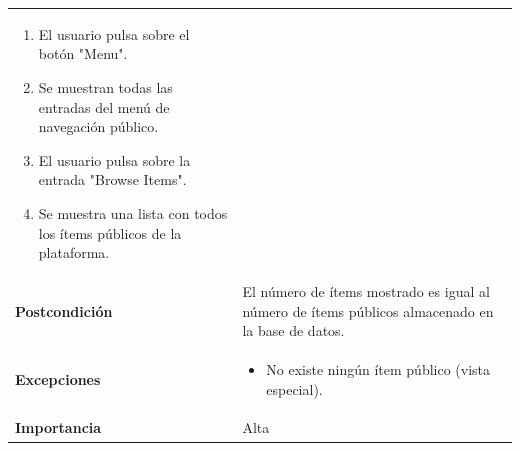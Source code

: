 \documentclass[
]{article}
\providecommand{\tightlist}{%
  \setlength{\itemsep}{0pt}\setlength{\parskip}{0pt}}
\begin{document}
\begin{longtable}[]{@{}ll@{}}
\begin{minipage}[t]{0.74\columnwidth}
\begin{enumerate}
\def\labelenumi{\arabic{enumi}.}
\tightlist
\item
  El usuario pulsa sobre el botón "Menu".
\item
  Se muestran todas las entradas del menú de navegación público.
\item
  El usuario pulsa sobre la entrada "Browse Items".
\item
  Se muestra una lista con todos los ítems públicos de la plataforma.
\end{enumerate}\strut
\end{minipage}\tabularnewline
\begin{minipage}[t]{0.20\columnwidth}\raggedright
\textbf{Postcondición}\strut
\end{minipage} & \begin{minipage}[t]{0.74\columnwidth}\raggedright
El número de ítems mostrado es igual al número de ítems públicos
almacenado en la base de datos.\strut
\end{minipage}\tabularnewline
\begin{minipage}[t]{0.20\columnwidth}\raggedright
\textbf{Excepciones}\strut
\end{minipage} & \begin{minipage}[t]{0.74\columnwidth}\raggedright
\begin{itemize}
\tightlist
\item
  No existe ningún ítem público (vista especial).
\end{itemize}\strut
\end{minipage}\tabularnewline
\begin{minipage}[t]{0.20\columnwidth}\raggedright
\textbf{Importancia}\strut
\end{minipage} & \begin{minipage}[t]{0.74\columnwidth}\raggedright
Alta\strut
\end{minipage}\tabularnewline
\bottomrule
\end{longtable}
\end{document}
